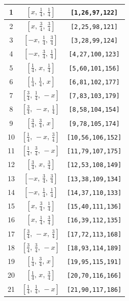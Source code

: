 \documentclass[fleqn,8pt]{jsarticle}
\begin{document}
\begin{longtable}{ccc}
1 & $\left[ x,\, \frac{1}{4},\, \frac{1}{4} \right]$ & {\tt [1,26,97,122]} \\ \hline
2 & $\left[ x,\, \frac{3}{4},\, \frac{3}{4} \right]$ & {\tt [2,25,98,121]} \\ \hline
3 & $\left[ - x,\, \frac{1}{4},\, \frac{3}{4} \right]$ & {\tt [3,28,99,124]} \\ \hline
4 & $\left[ - x,\, \frac{3}{4},\, \frac{1}{4} \right]$ & {\tt [4,27,100,123]} \\ \hline
5 & $\left[ \frac{1}{4},\, x,\, \frac{1}{4} \right]$ & {\tt [5,60,101,156]} \\ \hline
6 & $\left[ \frac{1}{4},\, \frac{1}{4},\, x \right]$ & {\tt [6,81,102,177]} \\ \hline
7 & $\left[ \frac{3}{4},\, \frac{1}{4},\, - x \right]$ & {\tt [7,83,103,179]} \\ \hline
8 & $\left[ \frac{3}{4},\, - x,\, \frac{1}{4} \right]$ & {\tt [8,58,104,154]} \\ \hline
9 & $\left[ \frac{3}{4},\, \frac{3}{4},\, x \right]$ & {\tt [9,78,105,174]} \\ \hline
10 & $\left[ \frac{1}{4},\, - x,\, \frac{3}{4} \right]$ & {\tt [10,56,106,152]} \\ \hline
11 & $\left[ \frac{1}{4},\, \frac{3}{4},\, - x \right]$ & {\tt [11,79,107,175]} \\ \hline
12 & $\left[ \frac{3}{4},\, x,\, \frac{3}{4} \right]$ & {\tt [12,53,108,149]} \\ \hline
13 & $\left[ - x,\, \frac{3}{4},\, \frac{3}{4} \right]$ & {\tt [13,38,109,134]} \\ \hline
14 & $\left[ - x,\, \frac{1}{4},\, \frac{1}{4} \right]$ & {\tt [14,37,110,133]} \\ \hline
15 & $\left[ x,\, \frac{3}{4},\, \frac{1}{4} \right]$ & {\tt [15,40,111,136]} \\ \hline
16 & $\left[ x,\, \frac{1}{4},\, \frac{3}{4} \right]$ & {\tt [16,39,112,135]} \\ \hline
17 & $\left[ \frac{3}{4},\, - x,\, \frac{3}{4} \right]$ & {\tt [17,72,113,168]} \\ \hline
18 & $\left[ \frac{3}{4},\, \frac{3}{4},\, - x \right]$ & {\tt [18,93,114,189]} \\ \hline
19 & $\left[ \frac{1}{4},\, \frac{3}{4},\, x \right]$ & {\tt [19,95,115,191]} \\ \hline
20 & $\left[ \frac{1}{4},\, x,\, \frac{3}{4} \right]$ & {\tt [20,70,116,166]} \\ \hline
21 & $\left[ \frac{1}{4},\, \frac{1}{4},\, - x \right]$ & {\tt [21,90,117,186]} \\ \hline

\end{longtable}
\end{document}
